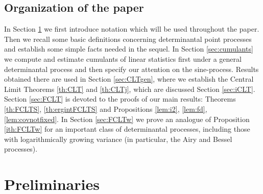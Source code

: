 \documentclass{article}
\numberwithin{equation}{section}
\newcommand{\lbl}{\label}
\newcommand{\rprop}{Proposition \nolinebreak}
\newcommand{\rsec}{Section \nolinebreak}
\begin{document}
\subsection{Organization of the paper}

In \rsec\ref{sec:preliminaries} we first introduce notation
which will be used throughout the paper.
Then we recall some basic definitions concerning determinantal point processes
and establish some simple facts needed in the sequel.
In \rsec \ref{sec:cumulants}
we compute and estimate
cumulants of linear statistics first under a general determinantal process
and then specify our attention on the sine-process.
Results obtained there
are used in \rsec \ref{sec:CLTgen},
where
we establish the Central Limit Theorems
\nolinebreak
\ref{th:CLT} and  \ref{th:CLTj},
which are discussed
\rsec \ref{sec:iCLT}.
\rsec \ref{sec:FCLT} is devoted to the proofs of our main results:
Theorems \nolinebreak \ref{th:FCLTS}, \ref{th:ergintFCLTS} and 
Propositions \ref{lem:i2}, \ref{lem:fd}, \ref{lem:covnotfixed}.
In \rsec \ref{sec:FCLTw} we prove an analogue of \rprop \ref{ith:FCLTw} for an important class of determinantal processes,
including those with logarithmically growing variance (in particular, the Airy and Bessel processes).





%
%
%
%
%
%
%
%
%
%







\section{Preliminaries}
\lbl{sec:preliminaries}
\end{document}
